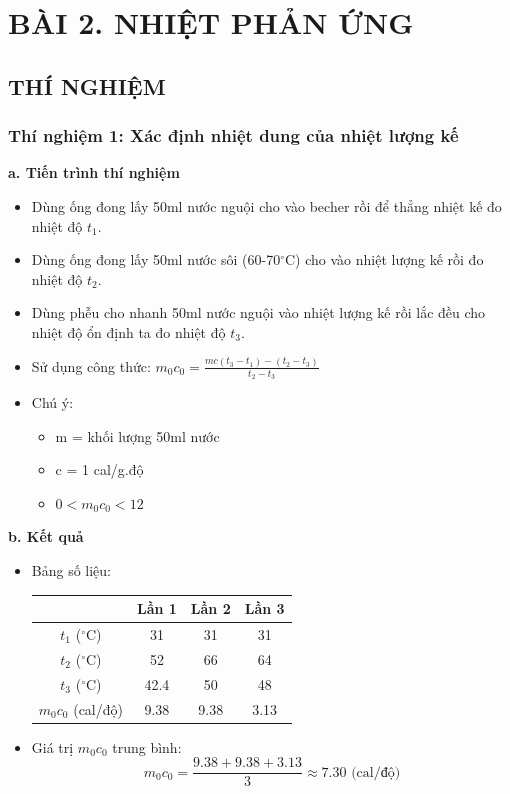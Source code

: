 \setcounter{section}{2}
\setcounter{subsection}{0}
\section*{\centering BÀI 2. NHIỆT PHẢN ỨNG}
\subsection{THÍ NGHIỆM}
\subsubsection{Thí nghiệm 1: Xác định nhiệt dung của nhiệt lượng kế}
\textbf{a. Tiến trình thí nghiệm}
\begin{itemize}
    \item Dùng ống đong lấy 50ml nước nguội cho vào becher rồi để thẳng nhiệt kế đo nhiệt độ $t_1$.
    \item Dùng ống đong lấy 50ml nước sôi (60-70$^\circ$C) cho vào nhiệt lượng kế rồi đo nhiệt độ $t_2$.
    \item Dùng phễu cho nhanh 50ml nước nguội vào nhiệt lượng kế rồi lắc đều cho nhiệt độ ổn định ta đo nhiệt độ $t_3$.
    \item Sử dụng công thức: $m_0c_0 = \frac{mc(t_3 - t_1) - (t_2 - t_3)}{t_2 - t_3}$
    \item Chú ý:
    \begin{itemize}
        \item m = khối lượng 50ml nước
        \item c = 1 cal/g.độ
        \item $0 < m_0c_0 < 12$
    \end{itemize}
\end{itemize}

\textbf{b. Kết quả}
\begin{itemize}
    \item Bảng số liệu:
    \begin{table}[H]
        \centering
        \begin{tabular}{|c|c|c|c|}
            \hline
            & \textbf{Lần 1} & \textbf{Lần 2} & \textbf{Lần 3} \\
            \hline
            $t_1$ ($^\circ$C) & 31 & 31 & 31 \\
            \hline
            $t_2$ ($^\circ$C) & 52 & 66 & 64 \\
            \hline
            $t_3$ ($^\circ$C) & 42.4 & 50 & 48 \\
            \hline
            $m_0c_0$ (cal/độ) & 9.38 & 9.38 & 3.13 \\
            \hline
        \end{tabular}
    \end{table}
    \item Giá trị $m_0c_0$ trung bình:
    $$m_0c_0 = \frac{9.38 + 9.38 + 3.13}{3} \approx 7.30 \text{ (cal/độ)}$$
\end{itemize}

